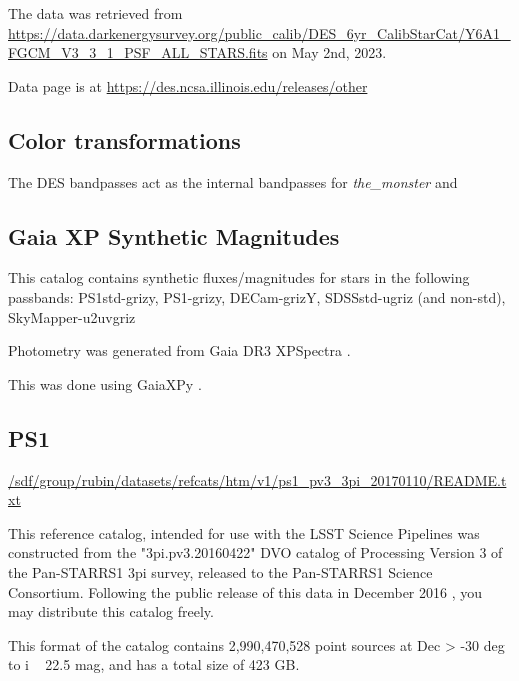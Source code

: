 The data was retrieved from \url{https://data.darkenergysurvey.org/public_calib/DES_6yr_CalibStarCat/Y6A1_FGCM_V3_3_1_PSF_ALL_STARS.fits} on May 2nd, 2023.

Data page is at \url{https://des.ncsa.illinois.edu/releases/other}

\subsection{Color transformations}
The DES bandpasses act as the internal bandpasses for \textit{the\_monster} and 

\subsection{Gaia XP Synthetic Magnitudes}
This catalog contains synthetic fluxes/magnitudes for stars in the following passbands:
PS1std-grizy, PS1-grizy, DECam-grizY, SDSSstd-ugriz (and non-std), SkyMapper-u2uvgriz

Photometry was generated from Gaia DR3 XPSpectra \cite{https://arxiv.org/abs/2206.06215}. 

This was done using GaiaXPy \cite{https://github.com/gaia-dpci/GaiaXPy/cd}.

\subsection{PS1}
\url{/sdf/group/rubin/datasets/refcats/htm/v1/ps1_pv3_3pi_20170110/README.txt}

This reference catalog, intended for use with the LSST Science Pipelines \cite{https://pipelines.lsst.io} was constructed from the "3pi.pv3.20160422" DVO catalog of Processing Version 3 of the Pan-STARRS1 3pi survey, released to the Pan-STARRS1 Science Consortium. Following the public release of this data in December 2016 \cite{http://panstarrs.stsci.edu}, you may distribute this catalog freely.

This format of the catalog contains 2,990,470,528 point sources at Dec > -30 deg to i ~ 22.5 mag, and has a total size of 423 GB. 

